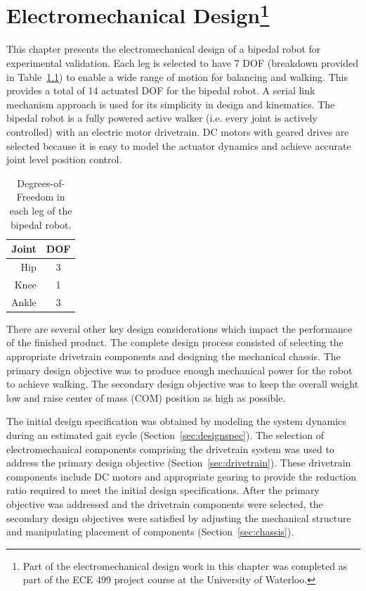 \chapter[Electromechanical Design]{Electromechanical Design\footnote{Part of the electromechanical design work in this chapter was completed as part of the ECE 499 project course at the University of Waterloo.}} %
\label{cha:design}

This chapter presents the electromechanical design of a bipedal robot for experimental validation. Each leg is selected to have 7 DOF (breakdown provided in Table~\ref{tab:doftable}) to enable a wide range of motion for balancing and walking. This provides a total of 14 actuated DOF for the bipedal robot. A serial link mechanism approach is used for its simplicity in design and kinematics. The bipedal robot is a fully powered active walker (i.e. every joint is actively controlled) with an electric motor drivetrain. DC motors with geared drives are selected because it is easy to model the actuator dynamics and achieve accurate joint level position control. 

\begin{table}[h]
  \centering
  \caption{Degrees-of-Freedom in each leg of the bipedal robot.}
    \begin{tabular}{rc}
    \addlinespace
    \toprule
    \textbf{Joint} & \textbf{DOF} \\
    \midrule
    Hip   & 3 \\
    Knee  & 1 \\
    Ankle & 3 \\
    \bottomrule
    \end{tabular}
  \label{tab:doftable}
\end{table}

There are several other key design considerations which impact the performance of the finished product. The complete design process consisted of selecting the appropriate drivetrain components and designing the mechanical chassis. The primary design objective was to produce enough mechanical power for the robot to achieve walking. The secondary design objective was to keep the overall weight low and raise center of mass (COM) position as high as possible. 

The initial design specification was obtained by modeling the system dynamics during an estimated gait cycle (Section~\ref{sec:designspec}). The selection of electromechanical components comprising the drivetrain system was used to address the primary design objective (Section~\ref{sec:drivetrain}). These drivetrain components include DC motors and appropriate gearing to provide the reduction ratio required to meet the initial design specifications. After the primary objective was addressed and the drivetrain components were selected, the secondary design objectives were satisfied by adjusting the mechanical structure and manipulating placement of components (Section~\ref{sec:chassis}).

